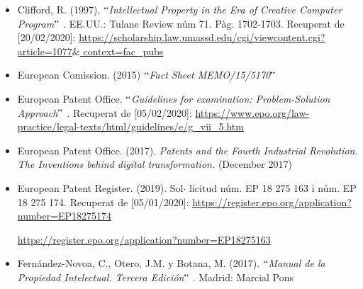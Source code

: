 \documentclass[12pt]{article}
\begin{document}
\begin{itemize}
\vspace{\baselineskip}
	\item Clifford, R. (1997). \textit{$``$Intellectual Property in the Era of Creative Computer Program$"$ . }EE.UU.: Tulane Review núm 71. Pàg. 1702-1703. Recuperat de [20/02/2020]: \href{https://scholarship.law.umassd.edu/cgi/viewcontent.cgi?article=1077&context=fac_pubs}{https://scholarship.law.umassd.edu/cgi/viewcontent.cgi?article=1077$\&$ context=fac\_pubs}\par


\vspace{\baselineskip}
	\item European Comission. (2015) $``$\textit{Fact Sheet MEMO/15/5170$"$ }\par


\vspace{\baselineskip}
	\item European Patent Office. \textit{$``$Guidelines for examination: Problem-Solution Approach$"$ . }Recuperat de [05/02/2020]: \href{https://www.epo.org/law-practice/legal-texts/html/guidelines/e/g_vii_5.htm}{https://www.epo.org/law-practice/legal-texts/html/guidelines/e/g\_vii\_5.htm}\par


\vspace{\baselineskip}
	\item European Patent Office. (2017). \textit{Patents and the Fourth Industrial Revolution. The Inventions behind digital transformation. }(December 2017)\par


\vspace{\baselineskip}
	\item European Patent Register. (2019). Sol$ \cdot $ licitud núm. EP 18 275 163 i núm. EP 18 275 174. Recuperat de [05/01/2020]: \href{https://register.epo.org/application?number=EP18275174}{https://register.epo.org/application?number=EP18275174} \par

\href{https://register.epo.org/application?number=EP18275163}{https://register.epo.org/application?number=EP18275163}\par


\vspace{\baselineskip}
	\item Fernández-Novoa, C., Otero, J.M. y Botana, M. (2017). \textit{$``$Manual de la Propiedad Intelectual. Tercera Edición$"$ }. Madrid: Marcial Pons\par



\end{itemize}
\end{document}
